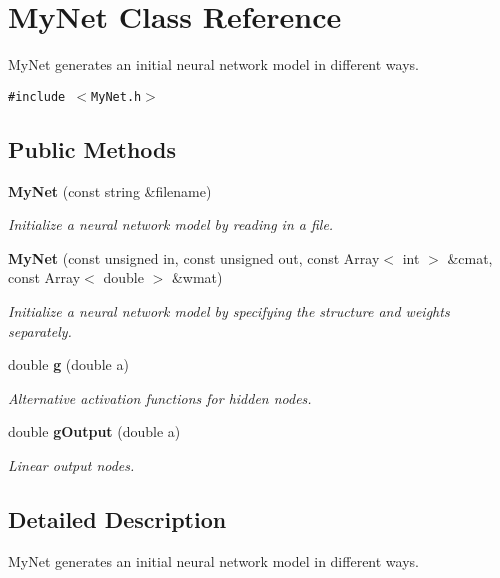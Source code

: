 \section{My\-Net Class Reference}
\label{classMyNet}
My\-Net generates an initial neural network model in different ways. 


{\tt \#include $<$My\-Net.h$>$}

\subsection*{Public Methods}
\begin{CompactItemize}
\item 
{\bf My\-Net} (const string \&filename)
\begin{CompactList}\small\item\em Initialize a neural network model by reading in a file.\item\end{CompactList}\item 
{\bf My\-Net} (const unsigned in, const unsigned out, const Array$<$ int $>$ \&cmat, const Array$<$ double $>$ \&wmat)
\begin{CompactList}\small\item\em Initialize a neural network model by specifying the structure and weights separately.\item\end{CompactList}\item 
{}
double {\bf g} (double a)\label{classMyNet_a2}

\begin{CompactList}\small\item\em Alternative activation functions for hidden nodes.\item\end{CompactList}\item 
{}
double {\bf g\-Output} (double a)\label{classMyNet_a4}

\begin{CompactList}\small\item\em Linear output nodes.\item\end{CompactList}\end{CompactItemize}


\subsection{Detailed Description}
My\-Net generates an initial neural network model in different ways.

